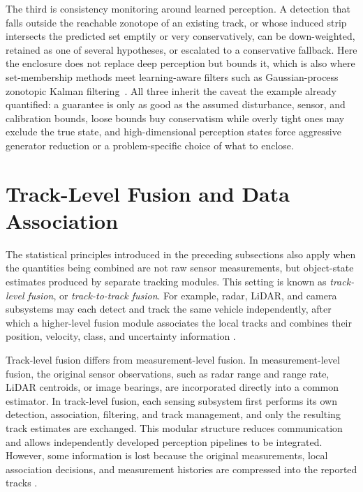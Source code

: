 \documentclass[graybox,envcountchap]{style/SNmono}
\begin{document}
The third is consistency monitoring around learned perception. A detection that
falls outside the reachable zonotope of an existing track, or whose induced strip
intersects the predicted set emptily or very conservatively, can be down-weighted,
retained as one of several hypotheses, or escalated to a conservative fallback.
Here the enclosure does not replace deep perception but bounds it, which is also
where set-membership methods meet learning-aware filters such as Gaussian-process
zonotopic Kalman filtering~\cite{li2022_gp_zkf}. All three inherit the caveat
the example already quantified: a guarantee is only as good as the assumed
disturbance, sensor, and calibration bounds, loose bounds buy conservatism while
overly tight ones may exclude the true state, and high-dimensional perception
states force aggressive generator reduction or a problem-specific choice of what
to enclose.




\section{Track-Level Fusion and Data Association}
\label{sec:track-level}
\label{subsec:track-fusion}



The statistical principles introduced in the preceding subsections also apply when the quantities being combined are not raw sensor measurements, but object-state estimates produced by separate tracking modules. This setting is known as \emph{track-level fusion}, or \emph{track-to-track fusion}. For example, radar, LiDAR, and camera subsystems may each detect and track the same vehicle independently, after which a higher-level fusion module associates the local tracks and combines their position, velocity, class, and uncertainty information \cite{liggins_handbook_2009,khaleghi_multisensor_2013,
barshalom1995multitarget,barshalom2011tracking}.

Track-level fusion differs from measurement-level fusion. In
measurement-level fusion, the original sensor observations, such as radar range and range rate, LiDAR centroids, or image bearings, are incorporated directly into a common estimator. In track-level fusion, each sensing subsystem first performs its own detection, association, filtering, and track management, and only the resulting track estimates are exchanged. This modular structure reduces communication and allows independently developed perception pipelines to be integrated. However, some information
is lost because the original measurements, local association decisions, and measurement histories are compressed into the reported tracks \cite{blackman1999design,barshalom2011tracking}.
\end{document}
